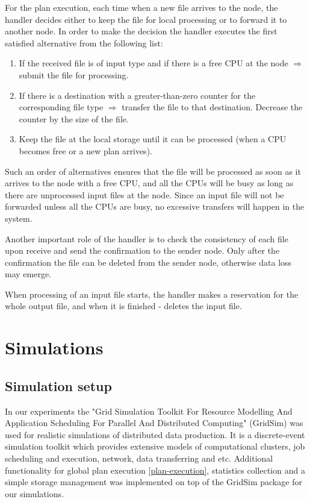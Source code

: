 \documentclass{svjour3}                     %
\begin{document}
For the plan execution, each time when a new file arrives to the node, the handler decides either to keep the file for local processing or to forward it to another node. In order to make the decision the handler executes the first satisfied alternative from the following list:

\begin{enumerate}
\item If the received file is of input type and if there is a free CPU at the node $\Rightarrow$ submit the file for processing.
\item If there is a destination with a greater-than-zero counter for the corresponding file type $\Rightarrow$ transfer the file to that destination. Decrease the counter by the size of the file.
\item Keep the file at the local storage until it can be processed (when a CPU becomes free  or a new plan arrives).
\end{enumerate}
Such an order of alternatives ensures that the file will be processed as soon as it arrives to the node with a free CPU, and all the CPUs will be busy as long as there are unprocessed input files at the node. Since an input file will not be forwarded unless all the CPUs are busy, no excessive transfers will happen in the system.

Another important role of the handler is to check the consistency of each file upon receive and send the confirmation to the sender node. Only after the confirmation the file can be deleted from the sender node, otherwise data loss may emerge. 

When processing of an input file starts, the handler makes a reservation for the whole output file, and when it is finished - deletes the input file.
\section{Simulations}
\subsection{Simulation setup}
In our experiments the "Grid Simulation Toolkit For Resource Modelling And Application Scheduling For Parallel And Distributed Computing" (GridSim) \cite{GridSim} was used for realistic simulations of distributed data production. It is a discrete-event simulation toolkit which provides extensive models of computational clusters, job scheduling and execution, network, data transferring and etc. Additional functionality for global plan execution \ref{plan-execution}, statistics collection and a simple storage management was implemented on top of the GridSim package for our simulations.
\end{document}
